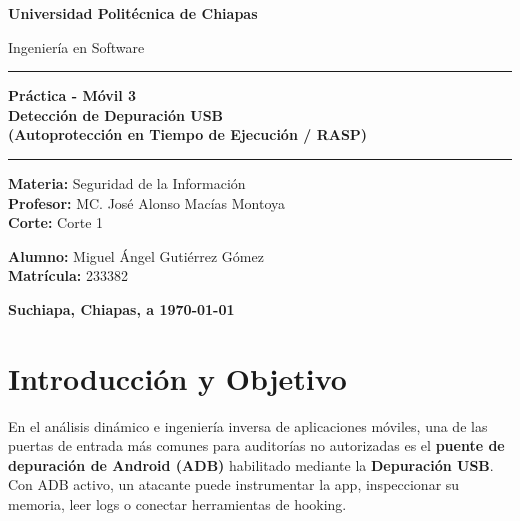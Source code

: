 \documentclass[12pt, a4paper]{article}
\newcommand{\nombreuniversidad}{Universidad Politécnica de Chiapas}
\newcommand{\nombrecarrera}{Ingeniería en Software}
\newcommand{\nombremateria}{Seguridad de la Información}
\newcommand{\nombreprofesor}{MC. José Alonso Macías Montoya}
\newcommand{\corte}{Corte 1}
\newcommand{\actividad}{Práctica - Móvil 3 \\ Detección de Depuración USB \\ (Autoprotección en Tiempo de Ejecución / RASP)}
\newcommand{\nombres}{Miguel Ángel Gutiérrez Gómez}
\newcommand{\matricula}{233382}
\newcommand{\fechaentrega}{\today}
\newcommand{\ciudad}{Suchiapa, Chiapas}
\begin{document}
\begin{titlepage}
    \centering
    \vspace*{1cm}
    {\Huge\bfseries \nombreuniversidad \par}
    \vspace{0.5cm}
    {\Large \nombrecarrera \par}

    \vspace{2cm}
    \rule{\textwidth}{1.5pt}
    \vspace{0.4cm}
    {\Large\bfseries \actividad \par}
    \vspace{0.4cm}
    \rule{\textwidth}{1.5pt}

    \vspace{3cm}

    \begin{flushleft}
        \centering
        \textbf{Materia:} \nombremateria \\
        \textbf{Profesor:} \nombreprofesor \\
        \textbf{Corte:} \corte
    \end{flushleft}

    \vspace{0.5cm}

    \begin{flushleft}
        \centering
        \textbf{Alumno:} \nombres \\
        \textbf{Matrícula:} \matricula \\
    \end{flushleft}

    \vfill
    \vspace{1cm}
    \textbf{\ciudad, a \fechaentrega}
\end{titlepage}

\clearpage

\section{Introducción y Objetivo}
\label{sec:intro}
En el análisis dinámico e ingeniería inversa de aplicaciones móviles, una de
las puertas de entrada más comunes para auditorías no autorizadas es el
\textbf{puente de depuración de Android (ADB)} habilitado mediante la
\textbf{Depuración USB}. Con ADB activo, un atacante puede instrumentar la app,
inspeccionar su memoria, leer logs o conectar herramientas de hooking.
\end{document}
